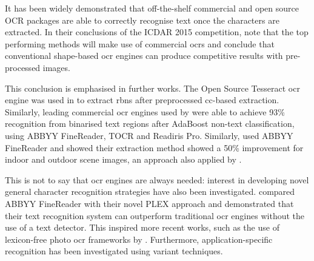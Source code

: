It has been widely demonstrated that off-the-shelf commercial and open source OCR packages are able to correctly recognise text once the characters are extracted. In their conclusions of the ICDAR 2015 competition, \citeauthor{Karatzas:2015tj} note that the top performing methods will make use of commercial \glspl{ocr} and conclude that conventional shape-based \gls{ocr} engines can produce competitive results with pre-processed images. 

This conclusion is emphasised in further works. The Open Source Tesseract \gls{ocr} engine was used in \citet{Benami:2012jf} to extract \glspl{rbn} after preprocessed \gls{cc}-based extraction. Similarly, leading commercial \gls{ocr} engines used by \citet{XiangrongChen:2004ha} were able to achieve 93\% recognition from binarised text regions after AdaBoost non-text classification, using ABBYY FineReader, TOCR and Readiris Pro. Similarly, \citet{Gatos:2005wd} used ABBYY FineReader and showed their extraction method showed a 50\% improvement for indoor and outdoor scene images, an approach also applied by \citet{XiangrongChen:2004ha}.

This is not to say that \gls{ocr} engines are always needed: interest in developing novel general character recognition strategies have also been investigated. \citet{Wang:2011tw} compared ABBYY FineReader with their novel PLEX approach and demonstrated that their text recognition system can outperform traditional \gls{ocr} engines without the use of a text detector. This inspired more recent works, such as the use of lexicon-free photo \gls{ocr} frameworks by \citet{Lee:2016uy}. Furthermore, application-specific recognition has been investigated using variant techniques.

